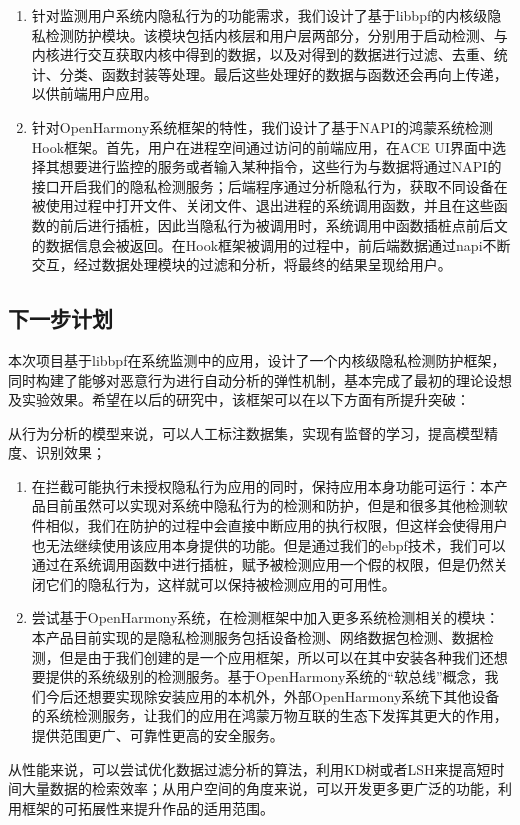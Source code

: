 \documentclass[12pt,a4paper]{ctexart}
\begin{document}
\begin{enumerate}[(1)]
  \item 针对监测用户系统内隐私行为的功能需求，我们设计了基于libbpf的内核级隐私检测防护模块。该模块包括内核层和用户层两部分，分别用于启动检测、与内核进行交互获取内核中得到的数据，以及对得到的数据进行过滤、去重、统计、分类、函数封装等处理。最后这些处理好的数据与函数还会再向上传递，以供前端用户应用。
  \item 针对OpenHarmony系统框架的特性，我们设计了基于NAPI的鸿蒙系统检测Hook框架。首先，用户在进程空间通过访问的前端应用，在ACE UI界面中选择其想要进行监控的服务或者输入某种指令，这些行为与数据将通过NAPI的接口开启我们的隐私检测服务；后端程序通过分析隐私行为，获取不同设备在被使用过程中打开文件、关闭文件、退出进程的系统调用函数，并且在这些函数的前后进行插桩，因此当隐私行为被调用时，系统调用中函数插桩点前后文的数据信息会被返回。在Hook框架被调用的过程中，前后端数据通过napi不断交互，经过数据处理模块的过滤和分析，将最终的结果呈现给用户。
\end{enumerate}
\subsection{下一步计划}
本次项目基于libbpf在系统监测中的应用，设计了一个内核级隐私检测防护框架，同时构建了能够对恶意行为进行自动分析的弹性机制，基本完成了最初的理论设想及实验效果。希望在以后的研究中，该框架可以在以下方面有所提升突破：\par
从行为分析的模型来说，可以人工标注数据集，实现有监督的学习，提高模型精度、识别效果；
\begin{enumerate}[(1)]
  \item 在拦截可能执行未授权隐私行为应用的同时，保持应用本身功能可运行：本产品目前虽然可以实现对系统中隐私行为的检测和防护，但是和很多其他检测软件相似，我们在防护的过程中会直接中断应用的执行权限，但这样会使得用户也无法继续使用该应用本身提供的功能。但是通过我们的ebpf技术，我们可以通过在系统调用函数中进行插桩，赋予被检测应用一个假的权限，但是仍然关闭它们的隐私行为，这样就可以保持被检测应用的可用性。
  \item 尝试基于OpenHarmony系统，在检测框架中加入更多系统检测相关的模块：本产品目前实现的是隐私检测服务包括设备检测、网络数据包检测、数据检测，但是由于我们创建的是一个应用框架，所以可以在其中安装各种我们还想要提供的系统级别的检测服务。基于OpenHarmony系统的“软总线”概念，我们今后还想要实现除安装应用的本机外，外部OpenHarmony系统下其他设备的系统检测服务，让我们的应用在鸿蒙万物互联的生态下发挥其更大的作用，提供范围更广、可靠性更高的安全服务。
\end{enumerate}
从性能来说，可以尝试优化数据过滤分析的算法，利用KD树或者LSH来提高短时间大量数据的检索效率；从用户空间的角度来说，可以开发更多更广泛的功能，利用框架的可拓展性来提升作品的适用范围。
\end{document}
